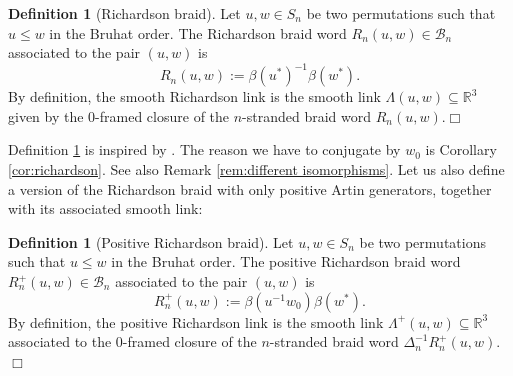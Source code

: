 \documentclass[10pt]{amsart}
\theoremstyle{plain}
\theoremstyle{definition}
\newtheorem{definition}[thm]{Definition}
\theoremstyle{remark}
\numberwithin{equation}{section}
\newcommand{\R}{\mathbb{R}}
\newcommand{\La}{\Lambda}
\newcommand{\sse}{\subseteq}
\newcommand{\cB}{\mathcal{B}}
\newcommand{\MG}[1]{{\color{teal}{{\bf Misha}: #1}}}
\begin{document}

\begin{definition}[Richardson braid]\label{def:Richardson}
Let $u,w\in S_n$ be two permutations such that $u\leq w$ in the Bruhat order. The Richardson braid word $R_n(u,w)\in\cB_n$ associated to the pair $(u,w)$ is
$$R_n(u,w):=\beta(u^*)^{-1}\beta(w^*).$$
By definition, the smooth Richardson link is the smooth link $\La(u,w)\sse\R^3$ given by the $0$-framed closure of the $n$-stranded braid word $R_{n}(u, w)$.\hfill$\Box$
\end{definition}

\noindent Definition \ref{def:Richardson} is inspired by \cite[Section 1.5]{GL}. The reason we have to conjugate by $w_0$ is Corollary \ref{cor:richardson}. See also Remark \ref{rem:different isomorphisms}. Let us also define a version of the Richardson braid with only positive Artin generators, together with its associated smooth link:

\begin{definition}[Positive Richardson braid]\label{def:pos Richardson}
Let $u, w \in S_n$ be two permutations such that $u \leq w$ in the Bruhat order. The positive Richardson braid word $R^{+}_{n}(u, w)\in\cB_n$ associated to the pair $(u, w)$ is
\[
R^{+}_{n}(u, w) := \beta(u^{-1}w_0)\beta(w^*).
\]
By definition, the positive Richardson link is the smooth link $\Lambda^{+}(u, w) \subseteq \R^{3}$ associated to the $0$-framed closure of the $n$-stranded braid word $\Delta^{-1}_{n}R^{+}_{n}(u, w)$.\hfill$\Box$
\end{definition}
\end{document}
